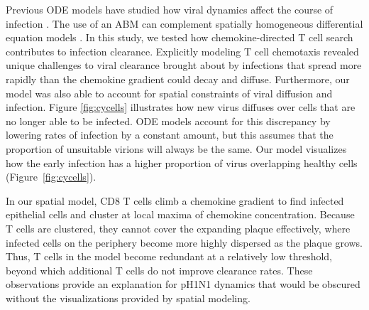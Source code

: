\documentclass[preprint,10pt,numbers]{elsarticle}
\begin{document}




Previous ODE models have studied how viral dynamics affect the course of infection \citep{Handel2008, Lee2009, Miao2010a, Mitchell2011, Saenz2010, Crauste2015, Price2015}.  The use of an ABM can complement spatially homogeneous differential equation models \citep{Beltman2007, Textor2014, Vroomans2012, Zheng2008}.  In this study, we tested how chemokine-directed T cell search contributes to infection clearance.  Explicitly modeling T cell chemotaxis revealed unique challenges to viral clearance brought about by infections that spread more rapidly than the chemokine gradient could decay and diffuse.  Furthermore, our model was also able to account for spatial constraints of viral diffusion and infection.  Figure \ref{fig:cycells} illustrates how new virus diffuses over cells that are no longer able to be infected.  ODE models account for this discrepancy by lowering rates of infection by a constant amount, but this assumes that the proportion of unsuitable virions will always be the same.  Our model visualizes how the early infection has a higher proportion of virus overlapping healthy cells (Figure~\ref{fig:cycells}).  

In our spatial model, CD8 T cells climb a chemokine gradient to find infected epithelial cells and cluster at local maxima of chemokine concentration.  Because T cells are clustered, they cannot cover the expanding plaque effectively, where infected cells on the periphery become more highly dispersed as the plaque grows.  Thus, T cells in the model become redundant at a relatively low threshold, beyond which additional T cells do not improve clearance rates. These observations provide an explanation for pH1N1 dynamics that would be obscured without the visualizations provided by spatial modeling.  %
\end{document}

